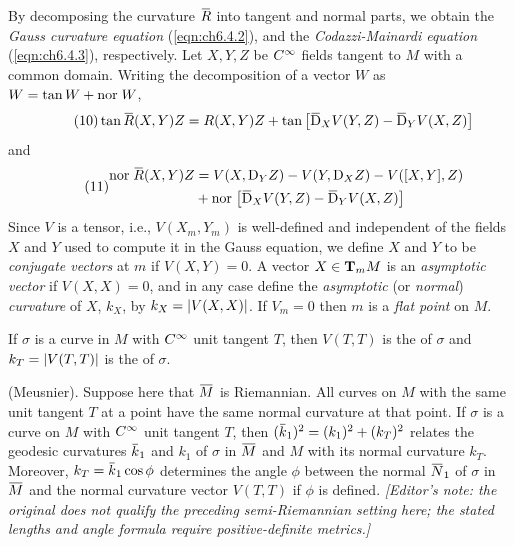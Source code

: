 \documentclass[../main]{subfiles}
\begin{document}
By decomposing the curvature $\xoverline R$ into tangent and normal parts, we obtain the \emph{Gauss curvature equation} (\ref{eqn:ch6.4.2}), and the \emph{Codazzi-Mainardi equation} (\ref{eqn:ch6.4.3}), respectively. Let $X,Y,Z$ be $\CInfty$ fields tangent to $M$ with a common domain. Writing the decomposition of a vector $W$ as $W=\tan W+\nor W$,
\begin{equation}\tag{10} \label{eqn:ch6.4.2}
    \tan\xoverline R(X,Y)Z = R(X,Y)Z+\tan\sbr{\covariant_XV(Y,Z)-\covariant_YV(X,Z)}
\end{equation}
and
\begin{equation}\tag{11}\label{eqn:ch6.4.3}
    \begin{split}
        \nor\xoverline R(X,Y)Z &= V(X,\D_YZ)-V(Y,\D_XZ)-V([X,Y],Z)\\
        &+\nor\big[\covariant_XV(Y,Z)-\covariant_YV(X,Z)\big]
    \end{split}
\end{equation}
Since $V$ is a tensor, i.e., $V(X_m,Y_m)$ is well-defined and independent of the fields $X$ and $Y$ used to compute it in the Gauss equation, we define $X$ and $Y$ to be \emph{conjugate vectors} at $m$ if $V(X,Y)=0$. A vector $X\in\tangentspace{M}{m}$ is an \emph{asymptotic vector} if $V(X,X)=0$, and in any case define the \emph{asymptotic} (or \emph{normal}) \emph{curvature} of $X$, $k_X$, by $k_X=\norm{V(X,X)}$. If $V_m=0$ then $m$ is a \emph{flat point} on $M$.

If $\sigma$ is a curve in $M$ with $\CInfty$ unit tangent $T$, then $V(T,T)$ is the  of $\sigma$ and $k_T=\norm{V(T,T)}$ is the  of $\sigma$.



\begin{theorem} \label{thm:ch6.4.2}
(Meusnier). Suppose here that $\xoverline M$ is Riemannian. All curves on $M$ with the same unit tangent $T$ at a point have the same normal curvature at that point. If $\sigma$ is a curve on $M$ with $\CInfty$ unit tangent $T$, then $(\xoverline k_1)^2 = (k_1)^2+(k_T)^2$
relates the geodesic curvatures $\xoverline k_1$ and $k_1$ of $\sigma$ in $\xoverline M$ and $M$ with its normal curvature $k_T$. Moreover, \newline$k_T = \xoverline k_1\cos\phi$
determines the angle $\phi$ between the normal $\xoverline N_1$ of $\sigma$ in $\xoverline M$ and the normal curvature vector $V(T,T)$ if $\phi$ is defined.
\emph{[Editor's note: the original does not qualify the preceding semi-Riemannian setting here; the stated lengths and angle formula require positive-definite metrics.]}
\end{theorem}
\end{document}
